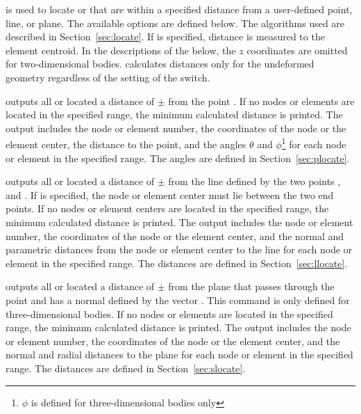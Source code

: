  {
 is used to locate  or  that are
within a specified distance from a user-defined point, line, or plane.
The available options are defined below.  The algorithms used are
described in Section~\ref{sec:locate}.  If  is specified,
distance is measured to the element centroid.  In the descriptions of
the  below, the $z$ coordinates are omitted for
two-dimensional bodies.   calculates distances only for the
undeformed geometry regardless of the setting of the 
switch.

 {
outputs all  or  located a
distance of $\pm$ from the
point .  If no nodes or elements are
located in the specified range, the minimum calculated distance
is printed.  The output includes the node or element number, the
coordinates of the node or the element center, the distance to the
point, and the angles $\theta$ and $\phi$\footnote{$\phi$ is defined for
three-dimensional bodies only} for each node or element in the specified
range.  The angles are defined in
Section~\ref{sec:plocate}.
}

 {
outputs all  or  located a distance of
$\pm$ from the line defined by the two
points , and . If
 is specified, the node or element center must lie between
the two end points.  If no nodes or element centers are located in the
specified range, the minimum calculated distance is printed.  The output
includes the node or element number, the coordinates of the node or the
element center, and the normal and parametric distances from the node or
element center to the line for each node or element in the specified
range.  The distances are defined in Section~\ref{sec:llocate}.
}

 {
outputs all  or  located a
distance of $\pm$ from the plane that
passes through the point  and has a normal
defined by the vector . This command is only
defined for three-dimensional bodies.  If no nodes or elements are
located in the specified range, the minimum calculated distance is
printed.  The output includes the node or element number, the
coordinates of the node or the element center, and the normal and
radial distances to the plane for each node or element in the specified
range.  The distances are defined in
Section~\ref{sec:slocate}.
}
}

